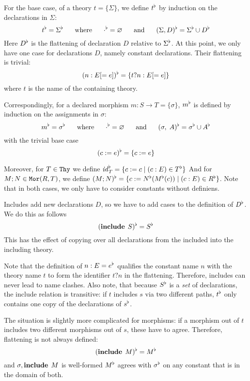 \begin{definition}[Flattening]
For the base case, of a theory $t=\{\Sigma\}$, we define $\flt{t}$ by induction on the declarations in $\Sigma$:
\[\flt{t}=\flt{\Sigma} \tb\mwhere\tb \flt{\cdot}=\es \tb\mand\tb
 \flt{(\Sigma,D)}=\flt{\Sigma}\cup\fltd{\flt{\Sigma}}{D}\]
Here $\fltd{T}{D}$ is the flattening of declaration $D$ relative to $\flt{\Sigma}$.
At this point, we only have one case for declarations $D$, namely constant declarations.
Their flattening is trivial:
 \[\fltd{\Sigma}{(n:E[=e])}=\{t?n:E[=e]\}\]
where $t$ is the name of the containing theory.

Correspondingly, for a declared morphism $m:S\to T=\{\sigma\}$, $\flt{m}$ is defined by induction on the assignments in $\sigma$:
\[\flt{m}=\flt{\sigma} \tb\mwhere\tb \flt{\cdot}=\es \tb\mand\tb\flt{(\sigma,\;A)}=\flt{\sigma}\cup\fltd{\flt{\sigma}}{A}\]
with the trivial base case
 \[\fltd{\sigma}{(c:=e)}=\{c:=e\}\]
\begin{nomodexp}
Moreover, for $T\in\Thy$ we define $\flt{\id{T}}=\{c:=c \;|\; (c:E)\in\flt{T}\}$
And for $M;N\in\Mo{R}{T}$, we define $\flt{(M;N)}=\{c:=\flt{N}(\flt{M}(c)) \;|\; (c:E)\in\flt{R}\}$.
Note that in both cases, we only have to consider constants without definiens.
\end{nomodexp}
\end{definition}

\begin{example}\label{sem:incl}
Includes add new declarations $D$, so we have to add cases to the definition of $\fltd{\Sigma}{D}$.
We do this as follows
  \[\fltd{\Sigma}{(\icl{S})} = \flt{S}\]
This has the effect of copying over all declarations from the included into the including theory.

Note that the definition of $\fltd{\Sigma}{n:E=e}$ qualifies the constant name $n$ with the theory name $t$ to form the identifier $t?n$ in the flattening.
Therefore, includes can never lead to name clashes.
Also note, that because $\flt{S}$ is a \textit{set} of declarations, the include relation is transitive: if $t$ includes $s$ via two different paths, $\flt{t}$ only contains one copy of the declarations of $\flt{s}$.

The situation is slightly more complicated for morphisms: if a morphism out of $t$ includes two different morphisms out of $s$, these have to agree.
Therefore, flattening is not always defined:
  \[\fltd{\sigma}{(\icl{M})} = \flt{M}\]
and $\sigma,\icl{M}$ is well-formed $\flt{M}$ agrees with $\flt{\sigma}$ on any constant that is in the domain of both.
\end{example}


